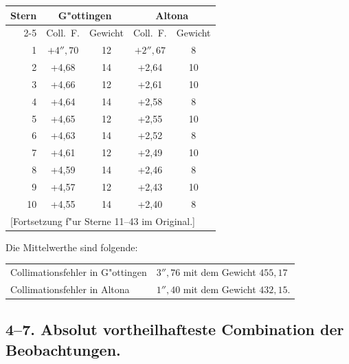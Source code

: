 \documentclass[12pt,a4paper]{article}
\theoremstyle{plain}
\theoremstyle{definition}
\theoremstyle{remark}
\begin{document}
\vspace{0.3cm}
\begin{center}
\begin{tabular}{|r|c|c||c|c|}
\hline
\rule{0pt}{1.2em}\rule[-0.3em]{0pt}{0pt}
Stern & \multicolumn{2}{c||}{G"ottingen} & \multicolumn{2}{c|}{Altona} \\
\cline{2-5}
\rule{0pt}{1em} & Coll.~F. & Gewicht & Coll.~F. & Gewicht \\
\hline
\rule{0pt}{1em}
1 & $+4''{,}70$ & 12 & $+2''{,}67$ & \phantom{0}8 \\
2 & +4,68 & 14 & +2,64 & 10 \\
3 & +4,66 & 12 & +2,61 & 10 \\
4 & +4,64 & 14 & +2,58 & \phantom{0}8 \\
5 & +4,65 & 12 & +2,55 & 10 \\
6 & +4,63 & 14 & +2,52 & \phantom{0}8 \\
7 & +4,61 & 12 & +2,49 & 10 \\
8 & +4,59 & 14 & +2,46 & \phantom{0}8 \\
9 & +4,57 & 12 & +2,43 & 10 \\
10 & +4,55 & 14 & +2,40 & \phantom{0}8 \\
\hline
\multicolumn{5}{l}{\rule{0pt}{1.2em}[Fortsetzung f"ur Sterne 11--43 im Original.]}
\end{tabular}
\end{center}

\vspace{0.3cm}
\noindent
Die Mittelwerthe sind folgende:

\begin{center}
\begin{tabular}{@{}l@{}l@{}}
Collimationsfehler in G"ottingen & $3''{,}76$ mit dem Gewicht $455{,}17$ \\[0.2em]
Collimationsfehler in Altona & $1''{,}40$ mit dem Gewicht $432{,}15$.
\end{tabular}
\end{center}

\subsection*{4--7. Absolut vortheilhafteste Combination der Beobachtungen.}
\end{document}
